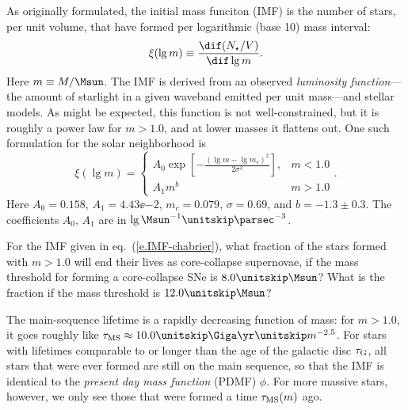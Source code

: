 As originally formulated\cite{Salpeter1955The-Luminosity-}, the initial mass funciton (IMF) is the number of stars, per unit volume, that have formed per logarithmic (base 10) mass interval:
\begin{equation}\label{e.IMF}
\xi(\lg m) \equiv \frac{\dif(N_{\star}/V)}{\dif\lg m}.
\end{equation}
Here $m \equiv M/\Msun$.
The IMF is derived from an observed \emph{luminosity function}---the amount of starlight in a given waveband emitted per unit mass---and stellar models.  As might be expected, this function is not well-constrained, but it is roughly a power law for $m > 1.0$, and at lower masses it flattens out. One such formulation\cite{Chabrier2003Galactic-Stella} for the solar neighborhood is
\begin{equation}\label{e.IMF-chabrier}
\xi(\lg m) = \left\{\begin{array}{lr}A_0\exp\left[-\frac{(\lg m - \lg m_c)^2}{2\sigma^2}\right], & m < 1.0 \\A_1 m^b & m > 1.0\end{array}\right. .
\end{equation}
Here $A_{0} = 0.158$, $A_{1} = 4.43\ee{-2}$, $m_{c} = 0.079$, $\sigma = 0.69$, and $b = -1.3\pm 0.3$.  The coefficients $A_{0}$, $A_{1}$ are in $\lg\Msun^{-1}\usp\parsec^{-3}$.

\begin{exercisebox}
 For the IMF given in eq.~(\ref{e.IMF-chabrier}), what fraction of the stars formed with $m > 1.0$ will end their lives as core-collapse supernovae, if the mass threshold for forming a core-collapse SNe is $8.0\nsp\Msun$?  What is the fraction if the mass threshold is $12.0\nsp\Msun$?
\end{exercisebox}

The main-sequence lifetime is a rapidly decreasing function of mass: for $m > 1.0$, it goes roughly like $\tms \approx 10.0\nsp\Giga\yr\nsp m^{-2.5}$. For stars with lifetimes comparable to or longer than the age of the galactic disc $\tau_{\mathrm{G}}$, all stars that were ever formed are still on the main sequence, so that the IMF is identical to  the \emph{present day mass function} (PDMF) $\phi$.  For more massive stars, however, we only see those that were formed a time $\tau_{\mathrm{MS}}(m)$ ago.

